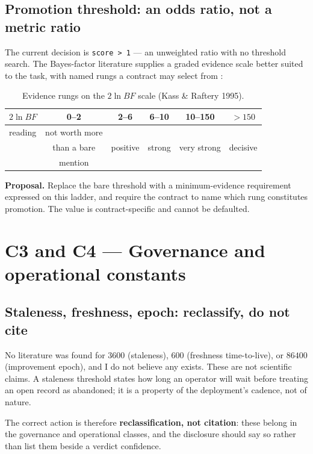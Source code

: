 \documentclass[11pt,letterpaper]{article}
\newcommand{\code}[1]{\texttt{#1}}
\begin{document}
\subsection{Promotion threshold: an odds ratio, not a metric ratio}

The current decision is \code{score > 1} --- an unweighted ratio with no threshold
search. The Bayes-factor literature supplies a graded evidence scale better suited
to the task, with named rungs a contract may select from
\cite{kass1995}:

\begin{table}[h]
\centering
\caption{Evidence rungs on the $2\ln BF$ scale (Kass \& Raftery 1995).}
\label{tab:bf}
\begin{tabular}{@{}lccccc@{}}
\toprule
$2\ln BF$ & 0--2 & 2--6 & 6--10 & 10--150 & $>150$ \\
\midrule
reading & not worth more & & & & \\
         & than a bare & positive & strong & very strong & decisive \\
         & mention & & & & \\
\bottomrule
\end{tabular}
\end{table}

\textbf{Proposal.} Replace the bare threshold with a minimum-evidence requirement
expressed on this ladder, and require the contract to name which rung constitutes
promotion. The value is contract-specific and cannot be defaulted.

\section{C3 and C4 --- Governance and operational constants}

\subsection{Staleness, freshness, epoch: reclassify, do not cite}

No literature was found for $3600$ (staleness), $600$ (freshness time-to-live),
or $86400$ (improvement epoch), and I do not believe any exists. These are not
scientific claims. A staleness threshold states how long an operator will wait
before treating an open record as abandoned; it is a property of the deployment's
cadence, not of nature.

The correct action is therefore \textbf{reclassification, not citation}: these
belong in the governance and operational classes, and the disclosure should say so
rather than list them beside a verdict confidence.
\end{document}
